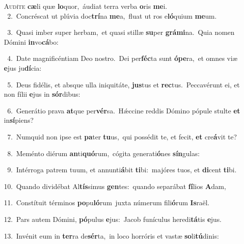 \lettrine{\initial\textcolor{\initialcolor}{A}}{udíte} \textbf{cæ}\-li quæ \textbf{lo}\-quor,~\star áudiat terra verba \textbf{o}\-ris \textbf{me}\-i.\\
{\numbfont\textcolor{\numbcolor}{~2.}}~Concréscat ut plúvia doc\-\textbf{trí}\-na \textbf{me}\-a,~\star fluat ut ros e\-\textbf{ló}\-quium \textbf{me}\-um.\par
{\numbfont\textcolor{\numbcolor}{~3.}}~Quasi imber super herbam,~\dagger et quasi stillæ \textbf{su}\-per \textbf{grá}\-\textbf{mi}na.~\star Quia nomen Dómini \textbf{in}\-vo\-\textbf{cá}\-bo:\par
{\numbfont\textcolor{\numbcolor}{~4.}}~Date magnificéntiam Deo nostro.~\dagger Dei per\-\textbf{féc}\-ta sunt \textbf{ó}\-\textbf{pe}ra,~\star et omnes viæ \textbf{e}\-jus ju\-\textbf{dí}\-cia:\par
{\numbfont\textcolor{\numbcolor}{~5.}}~Deus fidélis, et absque ulla iniquitáte, \textbf{jus}\-tus et \textbf{rec}\-tus.~\star Peccavérunt ei, et non fílii \textbf{e}\-jus in \textbf{sór}\-dibus:\par
{\numbfont\textcolor{\numbcolor}{~6.}}~Generátio prava \textbf{at}\-que per\-\textbf{vér}\-sa.~\star Hǽccine reddis Dómino pópule stulte \textbf{et} in\-\textbf{sí}\-piens?\par
{\numbfont\textcolor{\numbcolor}{~7.}}~Numquid non ipse est \textbf{pa}\-ter \textbf{tu}\-us,~\star qui possédit te, et fecit, \textbf{et} cre\-\textbf{á}\-vit te?\par
{\numbfont\textcolor{\numbcolor}{~8.}}~Meménto diérum \textbf{an}\-ti\-\textbf{quó}\-rum,~\star cógita generati\-\textbf{ó}\-nes \textbf{sín}\-gulas:\par
{\numbfont\textcolor{\numbcolor}{~9.}}~Intérroga patrem tuum, et annunti\-\textbf{á}\-bit \textbf{ti}\-bi:~\star majóres tuos, et \textbf{di}\-cent \textbf{ti}\-bi.\par
{\numbfont\textcolor{\numbcolor}{10.}}~Quando dividébat Al\-\textbf{tís}\-simus \textbf{gen}\-tes:~\star quando separábat \textbf{fí}\-lios \textbf{A}\-dam,\par
{\numbfont\textcolor{\numbcolor}{11.}}~Constítuit términos \textbf{po}\-pu\-\textbf{ló}\-rum~\star juxta númerum fili\-\textbf{ó}\-rum \textbf{Is}\-raël.\par
{\numbfont\textcolor{\numbcolor}{12.}}~Pars autem Dómini, \textbf{pó}\-pulus \textbf{e}\-jus:~\star Jacob funículus heredi\-\textbf{tá}\-tis \textbf{e}\-jus.\par
{\numbfont\textcolor{\numbcolor}{13.}}~Invénit eum in \textbf{ter}\-ra de\-\textbf{sér}\-ta,~\star in loco horróris et vastæ \textbf{so}\-li\-\textbf{tú}\-dinis:\par
